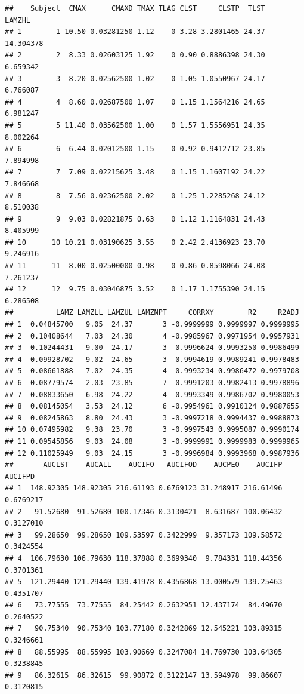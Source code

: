 \documentclass[]{krantz}
\theoremstyle{definition}
\theoremstyle{definition}
\theoremstyle{definition}
\theoremstyle{remark}
\begin{document}
\begin{verbatim}
##    Subject  CMAX      CMAXD TMAX TLAG CLST     CLSTP  TLST    LAMZHL
## 1        1 10.50 0.03281250 1.12    0 3.28 3.2801465 24.37 14.304378
## 2        2  8.33 0.02603125 1.92    0 0.90 0.8886398 24.30  6.659342
## 3        3  8.20 0.02562500 1.02    0 1.05 1.0550967 24.17  6.766087
## 4        4  8.60 0.02687500 1.07    0 1.15 1.1564216 24.65  6.981247
## 5        5 11.40 0.03562500 1.00    0 1.57 1.5556951 24.35  8.002264
## 6        6  6.44 0.02012500 1.15    0 0.92 0.9412712 23.85  7.894998
## 7        7  7.09 0.02215625 3.48    0 1.15 1.1607192 24.22  7.846668
## 8        8  7.56 0.02362500 2.02    0 1.25 1.2285268 24.12  8.510038
## 9        9  9.03 0.02821875 0.63    0 1.12 1.1164831 24.43  8.405999
## 10      10 10.21 0.03190625 3.55    0 2.42 2.4136923 23.70  9.246916
## 11      11  8.00 0.02500000 0.98    0 0.86 0.8598066 24.08  7.261237
## 12      12  9.75 0.03046875 3.52    0 1.17 1.1755390 24.15  6.286508
##          LAMZ LAMZLL LAMZUL LAMZNPT     CORRXY        R2     R2ADJ
## 1  0.04845700   9.05  24.37       3 -0.9999999 0.9999997 0.9999995
## 2  0.10408644   7.03  24.30       4 -0.9985967 0.9971954 0.9957931
## 3  0.10244431   9.00  24.17       3 -0.9996624 0.9993250 0.9986499
## 4  0.09928702   9.02  24.65       3 -0.9994619 0.9989241 0.9978483
## 5  0.08661888   7.02  24.35       4 -0.9993234 0.9986472 0.9979708
## 6  0.08779574   2.03  23.85       7 -0.9991203 0.9982413 0.9978896
## 7  0.08833650   6.98  24.22       4 -0.9993349 0.9986702 0.9980053
## 8  0.08145054   3.53  24.12       6 -0.9954961 0.9910124 0.9887655
## 9  0.08245863   8.80  24.43       3 -0.9997218 0.9994437 0.9988873
## 10 0.07495982   9.38  23.70       3 -0.9997543 0.9995087 0.9990174
## 11 0.09545856   9.03  24.08       3 -0.9999991 0.9999983 0.9999965
## 12 0.11025949   9.03  24.15       3 -0.9996984 0.9993968 0.9987936
##       AUCLST    AUCALL    AUCIFO   AUCIFOD    AUCPEO    AUCIFP   AUCIFPD
## 1  148.92305 148.92305 216.61193 0.6769123 31.248917 216.61496 0.6769217
## 2   91.52680  91.52680 100.17346 0.3130421  8.631687 100.06432 0.3127010
## 3   99.28650  99.28650 109.53597 0.3422999  9.357173 109.58572 0.3424554
## 4  106.79630 106.79630 118.37888 0.3699340  9.784331 118.44356 0.3701361
## 5  121.29440 121.29440 139.41978 0.4356868 13.000579 139.25463 0.4351707
## 6   73.77555  73.77555  84.25442 0.2632951 12.437174  84.49670 0.2640522
## 7   90.75340  90.75340 103.77180 0.3242869 12.545221 103.89315 0.3246661
## 8   88.55995  88.55995 103.90669 0.3247084 14.769730 103.64305 0.3238845
## 9   86.32615  86.32615  99.90872 0.3122147 13.594978  99.86607 0.3120815

\end{verbatim}
\end{document}
